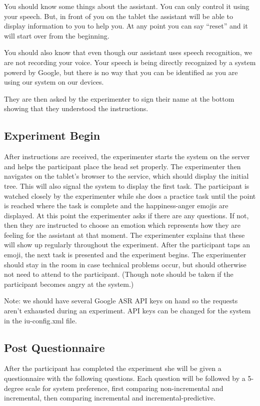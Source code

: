 \documentclass[a4paper,10pt]{article}
\begin{document}
You should know some things about the assistant. You can only control it using your speech. But, in front of you on the tablet the assistant will be able to display information to you to help you. At any point you can say ``reset'' and it will start over from the beginning. 

You should also know that even though our assistant uses speech recognition, we are not recording your voice. Your speech is being directly recognized by a system powerd by Google, but there is no way that you can be identified as you are using our system on our devices. 

They are then asked by the experimenter to sign their name at the bottom showing that they understood the instructions. 

\subsection{Experiment Begin}

After instructions are received, the experimenter starts the system on the server and helps the participant place the head set properly. The experimenter then navigates on the tablet's browser to the service, which should display the initial tree. This will also signal the system to display the first task. The participant is watched closely by the experimenter while she does a practice task until the point is reached where the task is complete and the happiness-anger emojis are displayed. At this point the experimenter asks if there are any questions. If not, then they are instructed to choose an emotion which represents how they are feeling for the assistant at that moment. The experimenter explains that these will show up regularly throughout the experiment. After the participant taps an emoji, the next task is presented and the experiment begins. The experimenter should stay in the room in case technical problems occur, but should otherwise not need to attend to the participant. (Though note should be taken if the participant becomes angry at the system.)

Note: we should have several Google ASR API keys on hand so the requests aren't exhausted during an experiment. API keys can be changed for the system in the iu-config.xml file. 

\subsection{Post Questionnaire}

After the participant has completed the experiment she will be given a questionnaire with the following questions. Each question will be followed by a 5-degree scale for system preference, first comparing non-incremental and incremental, then comparing incremental and incremental-predictive.
\end{document}
